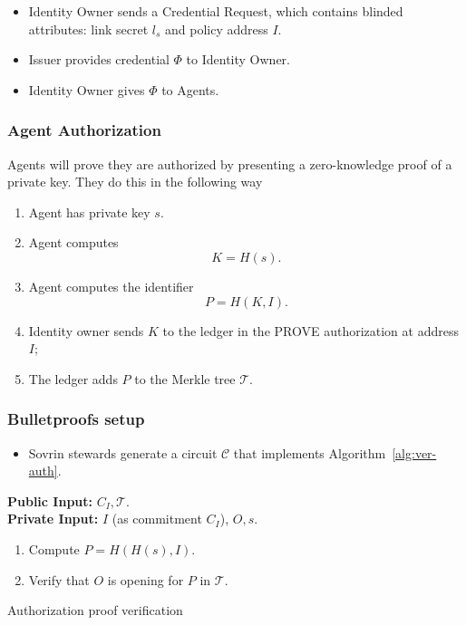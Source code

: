 \documentclass[a4paper]{article}
\begin{document}
\begin{itemize}
    \item Identity Owner sends a Credential Request, which contains blinded attributes: link secret $l_s$ and policy address $I$.
    \item Issuer provides credential $\Phi$  to Identity Owner.
    \item Identity Owner gives $\Phi$ to Agents.
\end{itemize}

\subsubsection{Agent Authorization}
Agents will prove they are authorized by presenting a zero-knowledge proof of a private key. They do this in the following way
\begin{enumerate}
    \item Agent has  private key $s$.
    \item Agent  computes
    $$
    K = H(s).
    $$
    
    \item Agent  computes the identifier
    $$
    P=H(K,I).
    $$
    \item Identity owner sends $K$ to the ledger in the PROVE authorization at address $I$;
    \item The ledger adds $P$ to  the Merkle tree $\mathcal{T}$.
\end{enumerate}

\subsubsection{Bulletproofs setup}
\begin{itemize}
    \item Sovrin stewards generate a  circuit $\mathcal{C}$ that implements Algorithm~\ref{alg:ver-auth}.
\end{itemize}


    \begin{algorithm}[!ht]
\textbf{Public Input:} $C_I,\mathcal{T}$.\\
\textbf{Private Input:} $I$ (as commitment $C_I$), $O,s$.
\begin{enumerate}
    \item Compute $P=H(H(s),I)$.
      \item Verify that $O$ is opening for $P$ in $\mathcal{T}$.
    \end{enumerate} 
    \caption{Authorization proof verification}\label{alg:ver-auth}
\end{algorithm}
\end{document}
